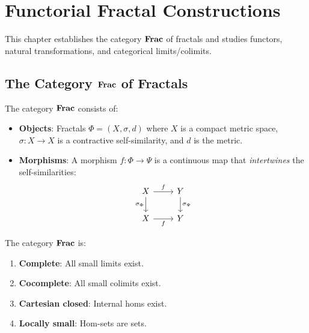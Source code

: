 
\chapter{Functorial Fractal Constructions}
\label{ch:functorial}

\begin{tcolorbox}[colback=blue!5!white,colframe=blue!75!black,title=\vnewfour]
This chapter establishes the category $\mathbf{Frac}$ of fractals and studies
functors, natural transformations, and categorical limits/colimits.
\end{tcolorbox}

\section{The Category $\mathbf{Frac}$ of Fractals}

\begin{definition}
\label{def:frac-cat}
The category $\mathbf{Frac}$ consists of:
\begin{itemize}
    \item \textbf{Objects}: Fractals $\Phi = (X, \sigma, d)$ where $X$ is a
    compact metric space, $\sigma: X \to X$ is a contractive self-similarity,
    and $d$ is the metric.

    \item \textbf{Morphisms}: A morphism $f: \Phi \to \Psi$ is a continuous
    map that \emph{intertwines} the self-similarities:
    \[
    \begin{tikzcd}
        X \arrow[r, "f"] \arrow[d, "\sigma_\Phi"'] & Y \arrow[d, "\sigma_\Psi"] \\
        X \arrow[r, "f"'] & Y
    \end{tikzcd}
    \]
\end{itemize}
\end{definition}

\begin{theorem}
\label{thm:cat-props}
The category $\mathbf{Frac}$ is:
\begin{enumerate}[label=(\alph*)]
    \item \textbf{Complete}: All small limits exist.
    \item \textbf{Cocomplete}: All small colimits exist.
    \item \textbf{Cartesian closed}: Internal homs exist.
    \item \textbf{Locally small}: Hom-sets are sets.
\end{enumerate}
\end{theorem}

